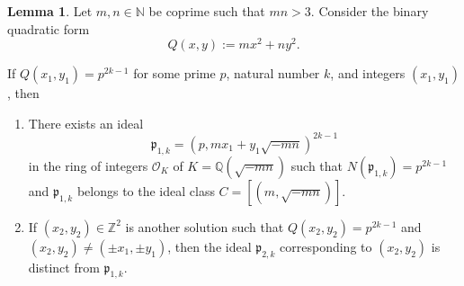 \documentclass[11pt]{amsart}
\theoremstyle{definition}
\newtheorem{lemma}[theorem]{Lemma}
\begin{document}
\begin{lemma}\label{pair ideal correspondence}
Let $m,n \in \mathbb{N}$ be coprime such that $mn>3$. Consider the binary quadratic form
\[
Q(x,y) := mx^2 + ny^2.
\]

If $Q(x_1,y_1) = p^{2k-1}$ for some prime $p$, natural number $k$, and integers $(x_1,y_1)$, then 
\begin{enumerate}
    \item[i.] There exists an ideal 
    \[
    \mathfrak{p}_{1,k} = (p, mx_1 + y_1\sqrt{-mn})^{2k-1}
    \] in the ring of integers $\mathcal{O}_K$ of $K=\mathbb{Q}(\sqrt{-mn})$ such that $N(\mathfrak{p}_{1,k})=p^{2k-1}$ and $\mathfrak{p}_{1,k}$ belongs to the ideal class $C = [(m, \sqrt{-mn})]$.
    
    \item[ii.] If $(x_2,y_2) \in \mathbb{Z}^2$ is another solution such that $Q(x_2,y_2)=p^{2k-1}$ and $(x_2,y_2) \neq (\pm x_1, \pm y_1)$, then the ideal $\mathfrak{p}_{2,k}$ corresponding to $(x_2,y_2)$ is distinct from $\mathfrak{p}_{1,k}$.
\end{enumerate}
\end{lemma}
\end{document}
